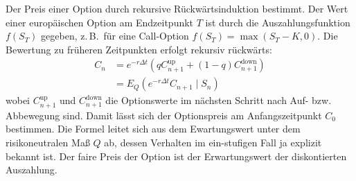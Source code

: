 \begin{satz}
Der Preis einer Option durch rekursive Rückwärtsinduktion bestimmt. 
Der Wert einer europäischen Option am Endzeitpunkt $T$ ist durch die Auszahlungsfunktion $f(S_T)$ gegeben, z.\,B.\ für eine Call-Option $f(S_T) = \max(S_T - K, 0)$.
Die Bewertung zu früheren Zeitpunkten erfolgt rekursiv rückwärts:
$$
\begin{aligned}
C_n &= e^{-r \Delta t} \left( q C_{n+1}^\text{up} + (1-q) C_{n+1}^\text{down} \right) \\
&= E_Q(e^{-r \Delta t} C_{n+1} \mid S_n)
\end{aligned}
$$
wobei $C_{n+1}^\text{up}$ und $C_{n+1}^\text{down}$ die Optionswerte im nächsten Schritt nach Auf- bzw. Abbewegung sind.
Damit lässt sich der Optionspreis am Anfangszeitpunkt $C_0$ bestimmen. Die Formel leitet
sich aus dem Ewartungswert unter dem risikoneutralen Maß $Q$ ab, dessen Verhalten im ein-stufigen Fall ja explizit bekannt ist.
Der faire Preis der Option ist der Erwartungswert der diskontierten Auszahlung.
\end{satz}

